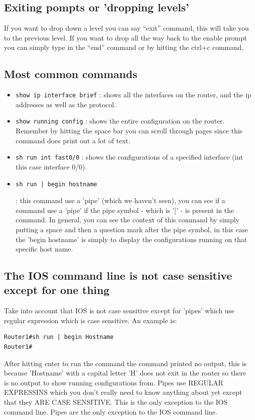 \subsection{Exiting pompts or 'dropping levels'}
If you want to drop down a level you can say ``exit'' command, this will take you to the previous level. If you want to drop all the way back to the enable prompt you can simply type in the ``end'' command or by hitting the ctrl+c command.

\subsection{Most common commands}
\begin{itemize}
    \item \verb|show ip interface brief| : shows all the interfaces on the router, and the ip addresses as well as the protocol.
    \item \verb|show running config| : shows the entire configuration on the router. Remember by hitting the space bar you can scroll through pages since this command does print out a lot of text.
    \item \verb|sh run int fast0/0| : shows the configurations of a specified interface (int this case interface 0/0).
    \item \begin{verbatim}sh run | begin hostname\end{verbatim} : this command use a 'pipe' (which we haven't seen), you can see if a command use a 'pipe' if the pipe symbol - which is '|' - is present in the command. In general, you can see the context of this command by simply putting a space and then a question mark after the pipe symbol, in this case the 'begin hostname' is simply to display the configurations running on that specific host name.
\end{itemize}

\subsection{The IOS command line is not case sensitive except for one thing}
Take into account that IOS is not case sensitive except for 'pipes' which use regular expression which is case sensitive. An example is: 
\begin{verbatim}
Router1#sh run | begin Hostname
Router1#
\end{verbatim}
After hitting enter to run the command the command printed no output, this is because 'Hostname' with a capital letter 'H' does not exit in the router so there is no output to show running configurations from. Pipes use REGULAR EXPRESSINS which you don't really need to know anything about yet except that they ARE CASE SENSITIVE. This is the only exception to the IOS command line. Pipes are the only exception to the IOS command line.


